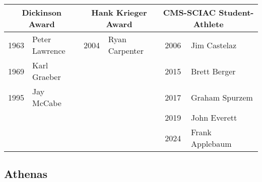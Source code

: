             \begin{table}[htbp]
                \centering
                \footnotesize
                \begin{tabular}{c l | c l | c l}
                \toprule
                \multicolumn{2}{c|}{\textbf{Dickinson Award}} & \multicolumn{2}{c|}{\textbf{Hank Krieger Award}} & \multicolumn{2}{c}{\textbf{CMS-SCIAC Student-Athlete}} \\
                \midrule
                1963 & Peter Lawrence & 2004 & Ryan Carpenter & 2006 & Jim Castelaz \\
                1969 & Karl Graeber & & & 2015 & Brett Berger \\
                1995 & Jay McCabe & & & 2017 & Graham Spurzem \\
                & & & & 2019 & John Everett \\
                & & & & 2024 & Frank Applebaum \\
                \bottomrule
                \end{tabular}
            \end{table}
        
                    

\subsection{Athenas}